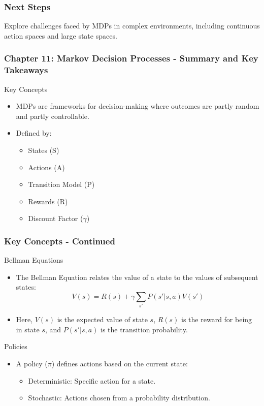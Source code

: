 \documentclass[aspectratio=169]{beamer}
\begin{document}
\begin{frame}[fragile]
    \frametitle{Next Steps}
    Explore challenges faced by MDPs in complex environments, including continuous action spaces and large state spaces.
\end{frame}

\begin{frame}[fragile]
    \frametitle{Chapter 11: Markov Decision Processes - Summary and Key Takeaways}
    \begin{block}{Key Concepts}
        \begin{itemize}
            \item MDPs are frameworks for decision-making where outcomes are partly random and partly controllable.
            \item Defined by:
            \begin{itemize}
                \item States (S)
                \item Actions (A)
                \item Transition Model (P)
                \item Rewards (R)
                \item Discount Factor ($\gamma$)
            \end{itemize}
        \end{itemize}
    \end{block}
\end{frame}

\begin{frame}[fragile]
    \frametitle{Key Concepts - Continued}
    \begin{block}{Bellman Equations}
        \begin{itemize}
            \item The Bellman Equation relates the value of a state to the values of subsequent states:
            \begin{equation}
                V(s) = R(s) + \gamma \sum_{s'} P(s'|s,a)V(s')
            \end{equation}
            \item Here, $V(s)$ is the expected value of state $s$, $R(s)$ is the reward for being in state $s$, and $P(s'|s,a)$ is the transition probability.
        \end{itemize}
    \end{block}

    \begin{block}{Policies}
        \begin{itemize}
            \item A policy ($\pi$) defines actions based on the current state:
            \begin{itemize}
                \item Deterministic: Specific action for a state.
                \item Stochastic: Actions chosen from a probability distribution.
            \end{itemize}
        \end{itemize}
    \end{block}
\end{frame}
\end{document}
